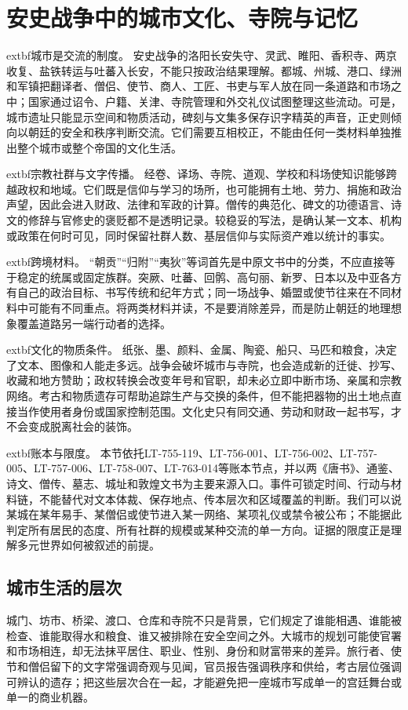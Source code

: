 \section{安史战争中的城市文化、寺院与记忆}
\label{sec:war-urban-culture-religion}

\noindent	extbf{城市是交流的制度。} 安史战争的洛阳长安失守、灵武、睢阳、香积寺、两京收复、盐铁转运与吐蕃入长安，不能只按政治结果理解。都城、州城、港口、绿洲和军镇把翻译者、僧侣、使节、商人、工匠、书吏与军人放在同一条道路和市场之中；国家通过诏令、户籍、关津、寺院管理和外交礼仪试图整理这些流动。可是，城市遗址只能显示空间和物质活动，碑刻与文集多保存识字精英的声音，正史则倾向以朝廷的安全和秩序判断交流。它们需要互相校正，不能由任何一类材料单独推出整个城市或整个帝国的文化生活。

\noindent	extbf{宗教社群与文字传播。} 经卷、译场、寺院、道观、学校和科场使知识能够跨越政权和地域。它们既是信仰与学习的场所，也可能拥有土地、劳力、捐施和政治声望，因此会进入财政、法律和军政的计算。僧传的典范化、碑文的功德语言、诗文的修辞与官修史的褒贬都不是透明记录。较稳妥的写法，是确认某一文本、机构或政策在何时可见，同时保留社群人数、基层信仰与实际资产难以统计的事实。

\noindent	extbf{跨境材料。} “朝贡”“归附”“夷狄”等词首先是中原文书中的分类，不应直接等于稳定的统属或固定族群。突厥、吐蕃、回鹘、高句丽、新罗、日本以及中亚各方有自己的政治目标、书写传统和纪年方式；同一场战争、婚盟或使节往来在不同材料中可能有不同重点。将两类材料并读，不是要消除差异，而是防止朝廷的地理想象覆盖道路另一端行动者的选择。

\noindent	extbf{文化的物质条件。} 纸张、墨、颜料、金属、陶瓷、船只、马匹和粮食，决定了文本、图像和人能走多远。战争会破坏城市与寺院，也会造成新的迁徙、抄写、收藏和地方赞助；政权转换会改变年号和官职，却未必立即中断市场、亲属和宗教网络。考古和物质遗存可帮助追踪生产与交换的条件，但不能把器物的出土地点直接当作使用者身份或国家控制范围。文化史只有同交通、劳动和财政一起书写，才不会变成脱离社会的装饰。

\noindent	extbf{账本与限度。} 本节依托LT-755-119、LT-756-001、LT-756-002、LT-757-005、LT-757-006、LT-758-007、LT-763-014等账本节点，并以两《唐书》、通鉴、诗文、僧传、墓志、城址和敦煌文书为主要来源入口。事件可锁定时间、行动与材料链，不能替代对文本体裁、保存地点、传本层次和区域覆盖的判断。我们可以说某城在某年易手、某僧侣或使节进入某一网络、某项礼仪或禁令被公布；不能据此判定所有居民的态度、所有社群的规模或某种交流的单一方向。证据的限度正是理解多元世界如何被叙述的前提。

\subsection{城市生活的层次}
城门、坊市、桥梁、渡口、仓库和寺院不只是背景，它们规定了谁能相遇、谁能被检查、谁能取得水和粮食、谁又被排除在安全空间之外。大城市的规划可能使官署和市场相连，却无法抹平居住、职业、性别、身份和财富带来的差异。旅行者、使节和僧侣留下的文字常强调奇观与见闻，官员报告强调秩序和供给，考古层位强调可辨认的遗存；把这些层次合在一起，才能避免把一座城市写成单一的宫廷舞台或单一的商业机器。

